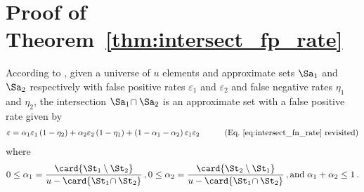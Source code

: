 \documentclass[ ../main.tex]{subfiles}
\begin{document}
\section{Proof of Theorem~\ref{thm:intersect_fp_rate}}
According to , given a universe of $u$ elements and approximate sets $\Sa_1$ and $\Sa_2$ respectively with false positive rates $\varepsilon_1$ and $\varepsilon_2$ and false negative rates $\eta_1$ and $\eta_2$, the intersection $\Sa_1 \! \cap \Sa_2$ is an approximate set with a false positive rate given by
\begin{equation*}
\begin{split}
    \varepsilon &= \alpha_1 \varepsilon_1 \left(1 - \eta_2\right) + \alpha_2 \varepsilon_2 \left(1 - \eta_1\right) + \left(1 - \alpha_1 - \alpha_2\right) \varepsilon_1 \varepsilon_2
\end{split}
\tag{Eq.~\ref{eq:intersect_fn_rate} revisited}
\end{equation*}
where
\begin{equation*}
    0 \leq \alpha_1 = \frac{\card{\St_1 \setminus \St_2}}{u - \card{\St_1 \! \cap \St_2}}\,,
    0 \leq \alpha_2 = \frac{\card{\St_2 \setminus \St_1}}{u - \card{\St_1 \! \cap \St_2}}\,,
    \textrm{and} \; \alpha_1 + \alpha_2 \leq 1\,.
\end{equation*}
\end{document}
